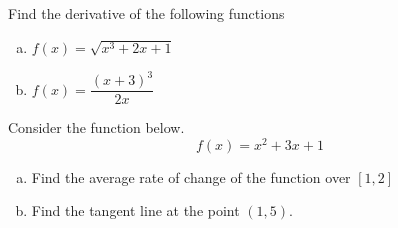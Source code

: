 \documentclass[11pt]{exam}
\theoremstyle{definition}
\begin{document}
\begin{questions}
\newpage
\addpoints 
\question[4] Find the derivative of the following functions 
\begin{enumerate}[a)]
\item $f(x)=\sqrt{x^3+2x+1}$
\vfill
\item $f(x)=\dfrac{(x+3)^3}{2x}$
\vfill
\end{enumerate}
\question[4] Consider the function below. 
\[f(x)=x^2+3x+1\]
\begin{enumerate}[a)]
\item Find the average rate of change of the function over $[1,2]$
\vfill
\item Find the tangent line at the point $(1,5)$. 
\vfill
\end{enumerate}








\end{questions}
\end{document}
